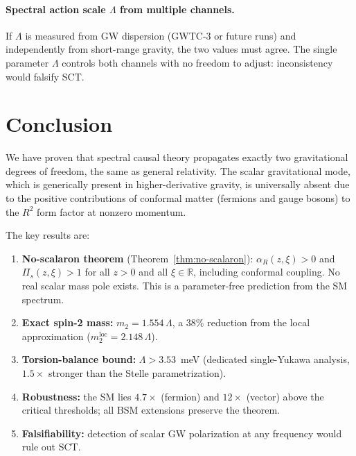 \documentclass[12pt,a4paper]{article}
\newcommand{\Lam}{\Lambda}
\newcommand{\Pis}{\Pi_{s}}
\newcommand{\alphaR}{\alpha_R}
\begin{document}
\paragraph{Spectral action scale $\Lam$ from multiple channels.}
If $\Lam$ is measured from GW dispersion (GWTC-3 or future runs)
and independently from short-range gravity, the two values must
agree. The single parameter $\Lam$ controls both channels with no
freedom to adjust: inconsistency would falsify SCT.


\section{Conclusion}
\label{sec:conclusion}

We have proven that spectral causal theory propagates exactly two
gravitational degrees of freedom, the same as general relativity.
The scalar gravitational mode, which is generically present in
higher-derivative gravity, is universally absent due to the positive
contributions of conformal matter (fermions and gauge bosons) to the
$R^2$ form factor at nonzero momentum.

The key results are:
\begin{enumerate}
  \item \textbf{No-scalaron theorem} (Theorem~\ref{thm:no-scalaron}):
    $\alphaR(z,\xi) > 0$ and $\Pis(z,\xi) > 1$ for all $z > 0$ and
    all $\xi \in \mathbb{R}$, including conformal coupling. No real
    scalar mass pole exists. This is a parameter-free prediction from
    the SM spectrum.

  \item \textbf{Exact spin-2 mass:} $m_2 = 1.554\,\Lam$, a 38\%
    reduction from the local approximation ($m_2^{\mathrm{loc}} = 2.148\,\Lam$).

  \item \textbf{Torsion-balance bound:} $\Lam > 3.53$~meV (dedicated
    single-Yukawa analysis, $1.5\times$ stronger than the Stelle
    parametrization).

  \item \textbf{Robustness:} the SM lies $4.7\times$ (fermion) and
    $12\times$ (vector) above the critical thresholds; all BSM
    extensions preserve the theorem.

  \item \textbf{Falsifiability:} detection of scalar GW polarization
    at any frequency would rule out SCT.
\end{enumerate}
\end{document}
